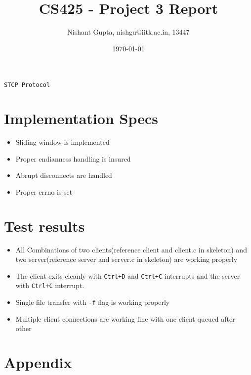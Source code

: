 \documentclass[11pt]{article}
\author{Nishant Gupta, nishgu@iitk.ac.in, 13447}
\date{\today}
\title{CS425 - Project 3 Report}
\begin{document}
\maketitle
\begin{center}
\texttt{\Huge STCP Protocol}
\end{center}
\newpage

\section{Implementation Specs}
\label{sec:orgheadline1}
\begin{itemize}
\item Sliding window is implemented
\item Proper endianness handling is insured
\item Abrupt disconnects are handled
\item Proper errno is set
\end{itemize}

\section{Test results}
\label{sec:orgheadline2}
\begin{itemize}
\item All Combinations of two clients(reference client and client.c in skeleton) and 
two server(reference server and server.c in skeleton) are working properly
\item The client exits cleanly with \texttt{Ctrl+D} and \texttt{Ctrl+C} interrupts and the server with \texttt{Ctrl+C} interrupt.
\item Single file transfer with \texttt{-f} flag is working properly
\item Multiple client connections are working fine with one client queued after other
\end{itemize}

\section{Appendix}
\label{sec:orgheadline4}
\end{document}
